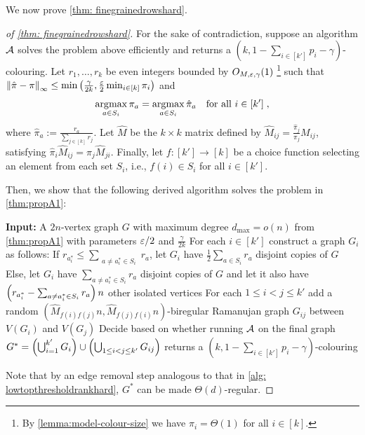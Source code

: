 We now prove \cref{thm: finegrainedrowshard}.

\begin{proof}[of \cref{thm: finegrainedrowshard}]
    For the sake of contradiction, suppose an algorithm $\mathcal{A}$ solves the problem above efficiently and returns a $(k, 1 - \sum_{i \in [k']} p_i - \gamma)$-colouring.
    Let $r_1, \ldots, r_k$ be even integers bounded by $O_{M, \varepsilon, \gamma}(1)\;$\footnote{By \cref{lemma:model-colour-size} we have $\pi_i=\Theta(1)$ for all $i\in[k]$.} such that $\left\lVert\hat{\pi} - \pi\right\rVert_{\infty}\leq \min\left(\frac{\gamma}{2k}, \frac{\varepsilon}{2}\min_{i\in [k]}\pi_i\right)$ and  \[\operatorname*{\arg\!\max}_{a \in S_i} \pi_a=\operatorname*{\arg\!\max}_{a \in S_i} \hat{\pi}_a \quad\text{for all } i\in[k']\;,\] where $\hat{\pi}_a:=\frac{r_a}{\sum_{j\in[k]} r_j}$.
    Let $\widehat{M}$ be the $k\times k$ matrix defined by $\widehat{M}_{ij}=\frac{\hat{\pi}_j}{\pi_j}M_{ij}$, satisfying $\hat{\pi}_i\widehat{M}_{ij}=\hat{\pi}_j\widehat{M}_{ji}$.
    Finally, let \( f : [k'] \to [k] \) be a choice function selecting an element from each set \( S_i \), i.e., \( f(i) \in S_i \) for all \( i \in [k'] \).
    
    Then, we show that the following derived algorithm solves the problem in \cref{thm:propA1}:

    \begin{algorithm}[H]
        \caption{Fine-grained model hardness algorithm}
        \label{alg: finegrainedrowshard}
        \DontPrintSemicolon
        \textbf{Input:} A $2n$-vertex graph $G$ with maximum degree $d_{\max} = o(n)$ from \cref{thm:propA1} with parameters $\varepsilon/2$ and $\frac{\gamma}{2k}$\;
        For each $i \in [k']$ construct a graph $G_i$ as follows:\;
        \quad If $r_{a_i^*} \leq \sum_{\substack{a \neq a_i^{*} \in S_i}} r_a$, let $G_i$ have $\frac{1}{2} \sum_{a \in S_i} r_a$ disjoint copies of $G$\;
        \quad Else, let $G_i$ have $\sum_{a \neq a_i^* \in S_i} r_a$ disjoint copies of $G$ and let it also have $\left(r_{a_i^*} - \sum_{a \neq a_i^* \in S_i} r_a\right)n$ other isolated vertices\;
        For each $1\leq i<j\leq k'$ add a random $(\widehat{M}_{f(i)f(j)}n, \widehat{M}_{f(j)f(i)}n)$-biregular Ramanujan graph $G_{ij}$ between $V(G_i)$ and $V(G_j)$\;
        Decide based on whether running $\mathcal{A}$ on the final graph $G^*=\left(\bigcup_{i=1}^{k'} G_i\right) \cup \left(\bigcup_{1 \leq i < j \leq k'} G_{ij}\right)$ returns a $(k, 1 - \sum_{i \in [k']} p_i - \gamma)$-colouring\;
    \end{algorithm}

    Note that by an edge removal step analogous to that in \cref{alg: lowtopthresholdrankhard}, $G^*$ can be made $\Theta(d)$-regular.


\end{proof}
